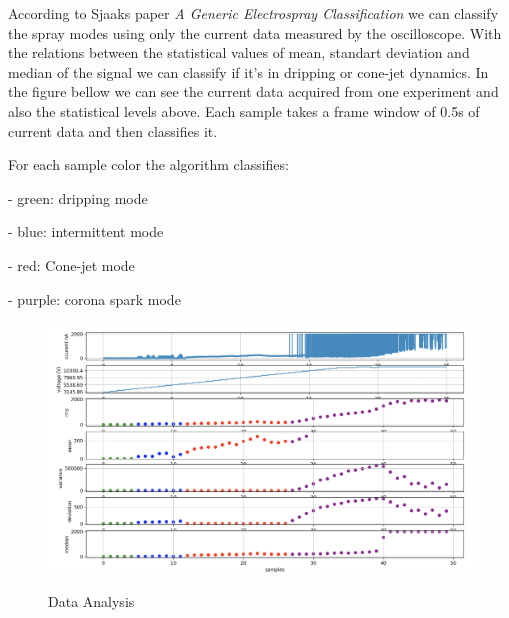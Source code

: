 According to Sjaaks paper \emph{A Generic Electrospray Classification}\cite*{Sjaaks} we can classify the spray modes using
only the current data measured by the oscilloscope. With the relations between the statistical values of mean, standart deviation and median of the signal
we can classify if it's in dripping or cone-jet dynamics. In the figure bellow we can see the current data acquired from one experiment and also the statistical levels
above. Each sample takes a frame window of 0.5s of current data and then classifies it.

For each sample color the algorithm classifies:

  - green: dripping mode

  - blue: intermittent mode

  - red: Cone-jet mode

  - purple: corona spark mode


\begin{figure}[H]
    \center
    \includegraphics[width=12cm]{images/exp_data.png}
    \label{img2}
    \caption{Data Analysis}
\end{figure}


